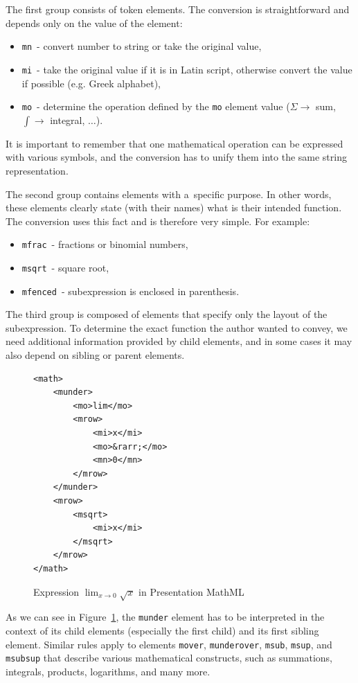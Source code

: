 \documentclass[11pt,oneside,final]{fithesis2}
\begin{document}
The first group consists of token elements. The conversion is straightforward and depends only on the value of the element:
\begin{itemize}
\item \texttt{mn}~- convert number to string or take the original value,
\item \texttt{mi}~- take the original value if it is in Latin script, otherwise convert the value if possible (e.g. Greek alphabet),
\item \texttt{mo}~- determine the operation defined by the \texttt{mo} element value ($\Sigma \rightarrow$ sum, $\int \rightarrow$ integral, $\ldots$).
\end{itemize}
It is important to remember that one mathematical operation can be expressed with various symbols, and the conversion has to unify them into the same string representation.

The second group contains elements with a~specific purpose. In other words, these elements clearly state (with their names) what is their intended function. The conversion uses this fact and is therefore very simple. For example:
\begin{itemize}
\item \texttt{mfrac}~- fractions or binomial numbers,
\item \texttt{msqrt}~- square root,
\item \texttt{mfenced}~- subexpression is enclosed in parenthesis.
\end{itemize}

The third group is composed of elements that specify only the layout of the subexpression. To determine the exact function the author wanted to convey, we need additional information provided by child elements, and in some cases it may also depend on sibling or parent elements. 
\begin{figure}[!ht]
\lstset{language=XML,frame=lines}
\begin{lstlisting}
<math>
	<munder>
		<mo>lim</mo>
		<mrow>
			<mi>x</mi>
			<mo>&rarr;</mo>
			<mn>0</mn>
		</mrow>		
	</munder>
	<mrow>
		<msqrt>
			<mi>x</mi>
		</msqrt>
	</mrow>
</math>
\end{lstlisting}
\caption{Expression $\lim_{x \to 0}\sqrt{x}$ in Presentation MathML}
\label{fig:mathmllimit}
\end{figure}

As we can see in Figure~\ref{fig:mathmllimit}, the \texttt{munder} element has to be interpreted in the context of its child elements (especially the first child) and its first sibling element. Similar rules apply to elements \texttt{mover}, \texttt{munderover}, \texttt{msub}, \texttt{msup}, and \texttt{msubsup} that describe various mathematical constructs, such as summations, integrals, products, logarithms, and many more.
\end{document}
